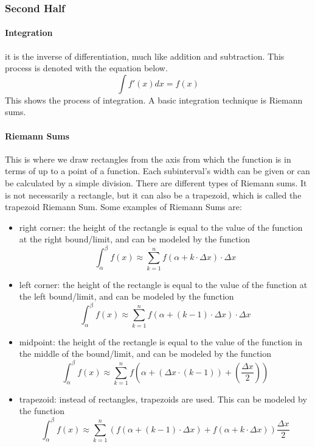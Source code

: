 \documentclass{article} %
\begin{document}
                \subsubsection{Second Half}
                    \paragraph{Integration}
                        it is the inverse of differentiation, much like addition and subtraction. This process is denoted with the equation below.
                        $$\int f'(x)dx = f(x)$$
                        This shows the process of integration. A basic integration technique is Riemann sums.
                    \paragraph{Riemann Sums}
                        This is where we draw rectangles from the axis from which the function is in terms of up to a point of a function. Each subinterval's width can be given or can be calculated by a simple division. There are different types of Riemann sums.
                        It is not necessarily a rectangle, but it can also be a trapezoid, which is called the trapezoid Riemann Sum.
                        Some examples of Riemann Sums are:
                        \begin{itemize}
                            \item right corner: the height of the rectangle is equal to the value of the function at the right bound/limit, and can be modeled by the function $$\int_\alpha^\beta f(x)\approx \sum_{k=1}^{n}f(\alpha+k \cdot \Delta x)\cdot\Delta x$$
                            \item left corner: the height of the rectangle is equal to the value of the function at the left bound/limit, and can be modeled by the function $$\int_\alpha^\beta f(x) \approx \sum_{k=1}^{n}f(\alpha+(k-1)\cdot \Delta x)\cdot\Delta x$$
                            \item midpoint: the height of the rectangle is equal to the value of the function in the middle of the bound/limit, and can be modeled by the function $$\int_\alpha^\beta f(x)\approx \sum_{k=1}^{n}f(\alpha+(\Delta x\cdot(k-1))+(\frac{\Delta x}{2}))$$
                        \item trapezoid: instead of rectangles, trapezoids are used. This can be modeled by the function $$\int_\alpha^\beta f(x)\approx \sum_{k=1}^{n}(f(\alpha+(k-1)\cdot\Delta x)+f(\alpha+k\cdot\Delta x))\frac{\Delta x}{2}$$
                        \end{itemize}
\end{document}
